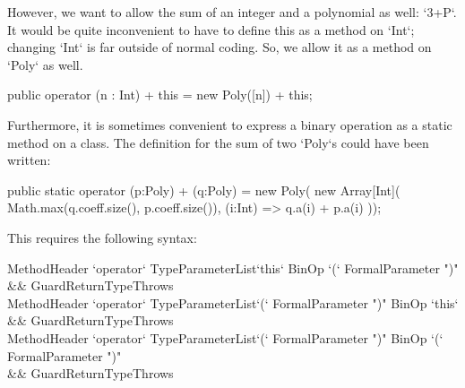 However, we want to allow the sum of an integer and a polynomial as well:
\xcd`3+P`.  It would be quite inconvenient to have to define this as a method
on \xcd`Int`; changing \xcd`Int` is far outside of normal coding.  So, we
allow it as a method on \xcd`Poly` as well.


% 
\begin{xten}
   public operator (n : Int) + this = new Poly([n]) + this;
\end{xten}
% 
%     

Furthermore, it is sometimes convenient to express a binary operation as a
static method on a class. 
The definition for the sum of two
\xcd`Poly`s could have been written:
\begin{xten}
  public static operator (p:Poly) + (q:Poly) =  new Poly(
     new Array[Int](
        Math.max(q.coeff.size(), p.coeff.size()),
        (i:Int) => q.a(i) + p.a(i)
     ));
\end{xten}
%
% 
%     


This requires the following syntax:\\ 
\begin{grammar}
MethodHeader \:
  \xcd`operator` TypeParameterList\opt \xcd`this` BinOp \xcd`(`  FormalParameter \xcd")" \\
  && Guard\opt ReturnType\opt  Throws\opt \\
MethodHeader \:
  \xcd`operator` TypeParameterList\opt \xcd`(`  FormalParameter \xcd")" BinOp \xcd`this`  \\
  && Guard\opt ReturnType\opt  Throws\opt \\
MethodHeader \:
  \xcd`operator` TypeParameterList\opt \xcd`(`  FormalParameter \xcd")" BinOp  \xcd`(`  FormalParameter \xcd")"  \\
  && Guard\opt ReturnType\opt  Throws\opt \\
\end{grammar}

